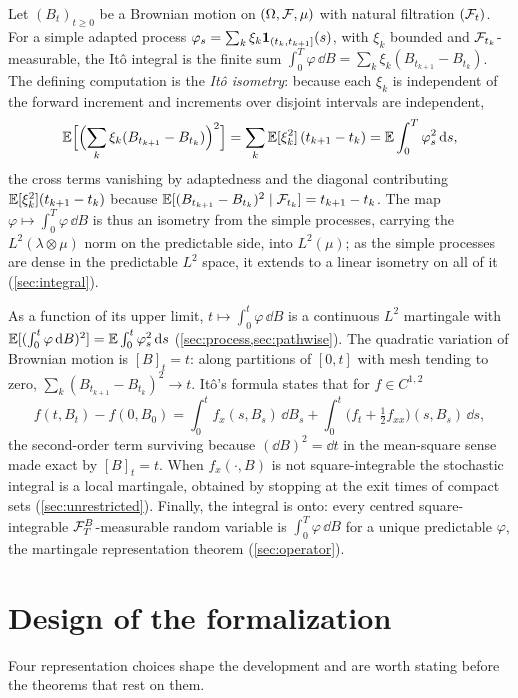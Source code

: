 \documentclass[11pt]{article}
\begin{document}
Let $(B_t)_{t\ge0}$ be a Brownian motion on $(\Omega,\mathcal{F},\mu)$ with natural filtration $(\mathcal{F}_t)$. For a simple
adapted process $\varphi_s=\sum_k\xi_k\mathbf{1}_{(t_k,t_{k+1}]}(s)$, with $\xi_k$ bounded and
$\mathcal{F}_{t_k}$-measurable, the It\^o integral is the finite sum
$\int_0^T\varphi\,\dd B=\sum_k\xi_k(B_{t_{k+1}}-B_{t_k})$. The defining computation is the \emph{It\^o
isometry}: because each $\xi_k$ is independent of the forward increment and increments over disjoint
intervals are independent,
\[
  \mathbb{E}\Bigl[\Bigl(\sum_k\xi_k(B_{t_{k+1}}-B_{t_k})\Bigr)^2\Bigr]=\sum_k\mathbb{E}[\xi_k^2]\,(t_{k+1}-t_k)
  =\mathbb{E}\int_0^T\varphi_s^2\,\mathrm{d} s,
\]
the cross terms vanishing by adaptedness and the diagonal contributing $\mathbb{E}[\xi_k^2](t_{k+1}-t_k)$ because
$\mathbb{E}[(B_{t_{k+1}}-B_{t_k})^2\mid\mathcal{F}_{t_k}]=t_{k+1}-t_k$. The map $\varphi\mapsto\int_0^T\varphi\,\dd B$ is
thus an isometry from the simple processes, carrying the $L^2(\lambda\otimes\mu)$ norm on the predictable
side, into $L^2(\mu)$; as the simple processes are dense in the predictable $L^2$ space, it extends to a
linear isometry on all of it (\cref{sec:integral}).

As a function of its upper limit, $t\mapsto\int_0^t\varphi\,\dd B$ is a continuous $L^2$ martingale with
$\mathbb{E}[(\int_0^t\varphi\,\mathrm{d} B)^2]=\mathbb{E}\int_0^t\varphi_s^2\,\mathrm{d} s$ (\cref{sec:process,sec:pathwise}). The
quadratic variation of Brownian motion is $[B]_t=t$: along partitions of $[0,t]$ with mesh tending to
zero, $\sum_k(B_{t_{k+1}}-B_{t_k})^2\to t$. It\^o's formula states that for $f\in C^{1,2}$
\[
  f(t,B_t)-f(0,B_0)=\int_0^tf_x(s,B_s)\,\dd B_s+\int_0^t\bigl(f_t+\tfrac12f_{xx}\bigr)(s,B_s)\,\dd s,
\]
the second-order term surviving because $(\dd B)^2=\dd t$ in the mean-square sense made exact by
$[B]_t=t$. When $f_x(\cdot,B)$ is not square-integrable the stochastic integral is a local martingale,
obtained by stopping at the exit times of compact sets (\cref{sec:unrestricted}). Finally, the integral
is onto: every centred square-integrable $\mathcal{F}^B_T$-measurable random variable is
$\int_0^T\varphi\,\dd B$ for a unique predictable $\varphi$, the martingale representation theorem
(\cref{sec:operator}).

\section{Design of the formalization}\label{sec:design}

Four representation choices shape the development and are worth stating before the theorems that rest on
them.
\end{document}

